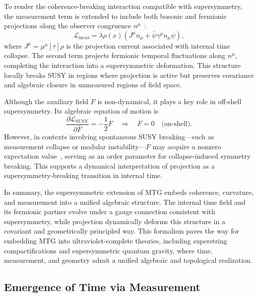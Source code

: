 \documentclass[11pt]{article}
\begin{document}
To render the coherence-breaking interaction compatible with supersymmetry, the measurement term is extended to include both bosonic and fermionic projections along the observer congruence \( n^\mu \)~\cite{bassi2013decoherence, ishibashi2015supersymmetric}:
\begin{equation}
\mathcal{L}_{\mathrm{meas}} = \lambda \rho(x) \left( J^\mu n_\mu + \bar{\psi} \gamma^\mu n_\mu \psi \right),
\end{equation}
where \( J^\mu = \mu^\mu[\tau] \rho \) is the projection current associated with internal time collapse. The second term projects fermionic temporal fluctuations along \( n^\mu \), completing the interaction into a supersymmetric deformation. This structure locally breaks SUSY in regions where projection is active but preserves covariance and algebraic closure in unmeasured regions of field space.

Although the auxiliary field \( F \) is non-dynamical, it plays a key role in off-shell supersymmetry. Its algebraic equation of motion is
\begin{equation}
\frac{\partial \mathcal{L}_{\mathrm{SUSY}}}{\partial \bar{F}} = - \frac{1}{2} F \quad \Rightarrow \quad F = 0 \quad \text{(on-shell)}.
\end{equation}
However, in contexts involving spontaneous SUSY breaking---such as measurement collapse or modular instability---\( F \) may acquire a nonzero expectation value~\cite{ishibashi2015supersymmetric}, serving as an order parameter for collapse-induced symmetry breaking. This supports a dynamical interpretation of projection as a supersymmetry-breaking transition in internal time.

In summary, the supersymmetric extension of MTG embeds coherence, curvature, and measurement into a unified algebraic structure. The internal time field and its fermionic partner evolve under a gauge connection consistent with supersymmetry, while projection dynamically deforms this structure in a covariant and geometrically principled way. This formalism paves the way for embedding MTG into ultraviolet-complete theories, including superstring compactifications and supersymmetric quantum gravity, where time, measurement, and geometry admit a unified algebraic and topological realization.

\subsection{Emergence of Time via Measurement}
\end{document}
